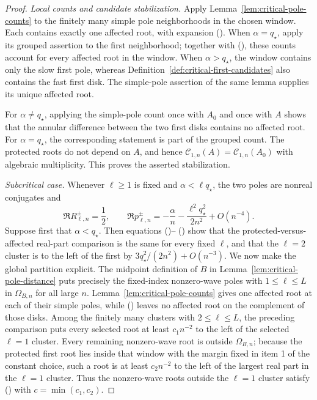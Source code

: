 \documentclass[twoside,10pt]{article}
\numberwithin{equation}{section}
\theoremstyle{slbody}
\theoremstyle{definition}
\theoremstyle{remark}
\renewcommand{\eqref}[1]{%
  \textup{{\normalfont(\oldstylenums{\ref{#1}}}\normalfont)}}
\begin{document}
\begin{proof}
\smallskip
\noindent\emph{Local counts and candidate stabilization.}
Apply Lemma~\ref{lem:critical-pole-counts} to the finitely many simple
pole neighborhoods in the chosen window.  Each contains exactly one
affected root, with expansion
\eqref{eq:critical-uniform-simple-shift}.  When $\alpha=q_\star$, apply its
grouped assertion to the first neighborhood; together with
\eqref{eq:critical-secular-exclusion}, these counts account for every
affected root in the window.  When $\alpha>q_\star$, the window contains only
the slow first pole, whereas
Definition~\ref{def:critical-first-candidates}
also contains the fast first disk.  The simple-pole assertion of the
same lemma supplies its unique affected root.

For $\alpha\ne q_\star$, applying the simple-pole count once with $A_0$ and
once with $A$ shows that the annular difference between the two first
disks contains no affected root.  For $\alpha=q_\star$, the corresponding
statement is part of the grouped count.  The protected roots do not
depend on $A$, and hence
$\mathcal C_{1,n}(A)=\mathcal C_{1,n}(A_0)$ with algebraic
multiplicity.  This proves the asserted stabilization.

\smallskip
\noindent\emph{Subcritical case.}
Whenever $\ell\ge1$ is fixed and $\alpha<\ell q_\star$, the two poles are
nonreal conjugates and
\begin{equation}\label{eq:critical-residue-real-half}
 \Re R_{\ell,n}^\pm=\frac12,
 \qquad
 \Re p_{\ell,n}^\pm
 =-\frac\alpha n-\frac{\ell^2q_\star^2}{2n^2}+O(n^{-4}).
\end{equation}
Suppose first that $\alpha<q_\star$.  Then equations
\eqref{eq:critical-uniform-simple-shift}--
\eqref{eq:critical-residue-real-half} show that the
protected-versus-affected real-part comparison is the same for every fixed $\ell$, and
that the $\ell=2$ cluster is to the left of the first by
$3q_\star^2/(2n^2)+O(n^{-3})$.  We now make the global
partition explicit.  The midpoint definition of $B$ in
Lemma~\ref{lem:critical-pole-distance} puts precisely the fixed-index
nonzero-wave poles with $1\le\ell\le L$ in $\Omega_{B,n}$ for all large
$n$.  Lemma~\ref{lem:critical-pole-counts} gives one affected root at
each of their simple poles, while \eqref{eq:critical-secular-exclusion}
leaves
no affected root on the complement of those disks.  Among the finitely
many clusters with $2\le\ell\le L$, the preceding comparison puts every
selected root at least $c_1n^{-2}$ to the left of the selected $\ell=1$
cluster.  Every remaining nonzero-wave root is outside $\Omega_{B,n}$;
because the protected first root lies inside that window with the margin
fixed in item 1 of the constant choice, such a root is at least
$c_2n^{-2}$ to the left of the largest real part in the $\ell=1$
cluster.  Thus the nonzero-wave roots outside the $\ell=1$ cluster satisfy
\eqref{eq:critical-exhaustion-separation} with
$c=\min(c_1,c_2)$.


\end{proof}
\end{document}
